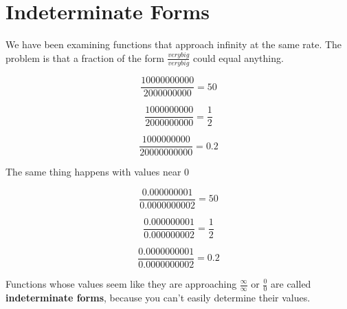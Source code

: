 \documentclass{ximera}
\begin{document}
\begin{example}
\begin{image}
\end{image}





\end{example}








\section{Indeterminate Forms}


We have been examining functions that approach infinity at the same rate.  The problem is that a fraction of the form $\frac{very big}{very big}$ could equal anything.



\[  \frac{10000000000}{2000000000} = 50      \]

\[  \frac{1000000000}{2000000000} = \frac{1}{2}      \]

\[  \frac{1000000000}{20000000000} = 0.2      \]





The same thing happens with values near $0$


\[  \frac{0.000000001}{0.0000000002} = 50      \]

\[  \frac{0.000000001}{0.000000002} = \frac{1}{2}      \]

\[  \frac{0.0000000001}{0.0000000002} = 0.2      \]





Functions whose values seem like they are approaching $\frac{\infty}{\infty}$ or $\frac{0}{0}$ are called \textbf{indeterminate forms}, because you can't easily determine their values.
\end{document}
